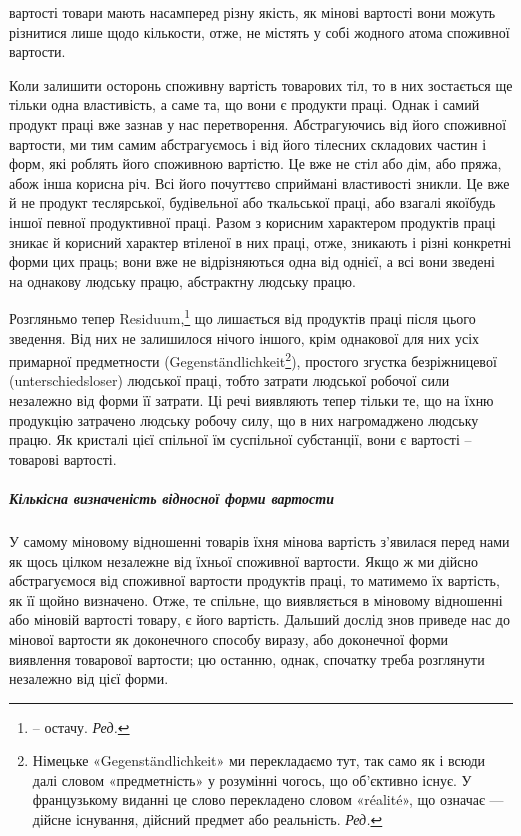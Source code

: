 \parcont{}  %
вартості товари мають насамперед різну якість, як мінові вартості
вони можуть різнитися лише щодо кількости, отже, не
містять у собі жодного атома споживної вартости.

Коли залишити осторонь споживну вартість товарових тіл,
то в них зостається ще тільки одна властивість, а саме та, що
вони є продукти праці. Однак і самий продукт праці вже зазнав
у нас перетворення. Абстрагуючись від його споживної вартости,
ми тим самим абстрагуємось і від його тілесних складових частин
і форм, які роблять його споживною вартістю. Це вже не стіл або
дім, або пряжа, абож інша корисна річ. Всі його почуттєво сприймані
властивості зникли. Це вже й не продукт теслярської, будівельної
або ткальської праці, або взагалі якоїбудь іншої певної
продуктивної праці. Разом з корисним характером продуктів
праці зникає й корисний характер втіленої в них праці, отже,
зникають і різні конкретні форми цих праць; вони вже не відрізняються
одна від однієї, а всі вони зведені на однакову людську
працю, абстрактну людську працю.

Розгляньмо тепер Residuum,\footnote*{
-- остачу. \emph{Ред.}
} що лишається від продуктів
праці після цього зведення. Від них не залишилося нічого іншого,
крім однакової для них усіх примарної предметности (Gegenständlichkeit\footnote*{
Німецьке «Gegenständlichkeit» ми перекладаємо тут, так само як
і всюди далі словом «предметність» у розумінні чогось, що об’єктивно
існує. У французькому виданні це слово перекладено словом «réalité»,
що означає — дійсне існування, дійсний предмет або реальність. \emph{Ред.}
}),
простого згустка безріжницевої (unterschiedsloser)
людської праці, тобто затрати людської робочої сили незалежно
від форми її затрати. Ці речі виявляють тепер тільки те,
що на їхню продукцію затрачено людську робочу силу, що в них
нагромаджено людську працю. Як кристалі цієї спільної їм суспільної
субстанції, вони є вартості -- товарові вартості.

\subparagraph{Кількісна визначеність відносної форми вартости}
У самому міновому відношенні товарів їхня мінова вартість
з’явилася перед нами як щось цілком незалежне від їхньої споживної
вартости. Якщо ж ми дійсно абстрагуємося від споживної
вартости продуктів праці, то матимемо їх вартість, як її щойно
визначено. Отже, те спільне, що виявляється в міновому відношенні
або міновій вартості товару, є його вартість. Дальший дослід
знов приведе нас до мінової вартости як доконечного способу
виразу, або доконечної форми виявлення товарової вартости; цю
останню, однак, спочатку треба розглянути незалежно від цієї форми.

